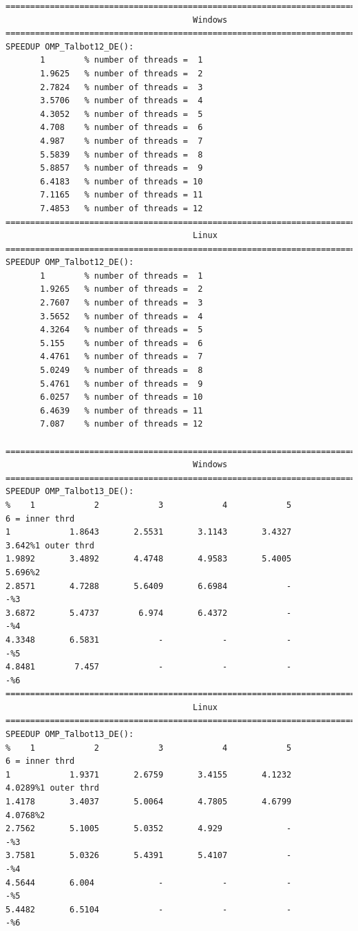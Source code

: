 \documentclass[a4paper,10pt]{report}%
\begin{document}
\begin{lstlisting}
====================================================================================
                                      Windows
====================================================================================
SPEEDUP OMP_Talbot12_DE():
       1        % number of threads =  1
       1.9625   % number of threads =  2
       2.7824   % number of threads =  3
       3.5706   % number of threads =  4
       4.3052   % number of threads =  5
       4.708    % number of threads =  6
       4.987    % number of threads =  7
       5.5839   % number of threads =  8
       5.8857   % number of threads =  9
       6.4183   % number of threads = 10
       7.1165   % number of threads = 11
       7.4853   % number of threads = 12
====================================================================================
                                      Linux
====================================================================================
SPEEDUP OMP_Talbot12_DE():
       1        % number of threads =  1
       1.9265   % number of threads =  2
       2.7607   % number of threads =  3
       3.5652   % number of threads =  4
       4.3264   % number of threads =  5
       5.155    % number of threads =  6
       4.4761   % number of threads =  7
       5.0249   % number of threads =  8
       5.4761   % number of threads =  9
       6.0257   % number of threads = 10
       6.4639   % number of threads = 11
       7.087    % number of threads = 12

====================================================================================
                                      Windows
====================================================================================
SPEEDUP OMP_Talbot13_DE():
%    1            2            3            4            5            6 = inner thrd
1            1.8643       2.5531       3.1143       3.4327        3.642%1 outer thrd
1.9892       3.4892       4.4748       4.9583       5.4005        5.696%2
2.8571       4.7288       5.6409       6.6984            -            -%3
3.6872       5.4737        6.974       6.4372            -            -%4
4.3348       6.5831            -            -            -            -%5
4.8481        7.457            -            -            -            -%6
====================================================================================
                                      Linux
====================================================================================
SPEEDUP OMP_Talbot13_DE():
%    1            2            3            4            5            6 = inner thrd
1            1.9371       2.6759       3.4155       4.1232       4.0289%1 outer thrd
1.4178       3.4037       5.0064       4.7805       4.6799       4.0768%2
2.7562       5.1005       5.0352       4.929             -            -%3
3.7581       5.0326       5.4391       5.4107            -            -%4
4.5644       6.004             -            -            -            -%5
5.4482       6.5104            -            -            -            -%6
\end{lstlisting}
\end{document}
